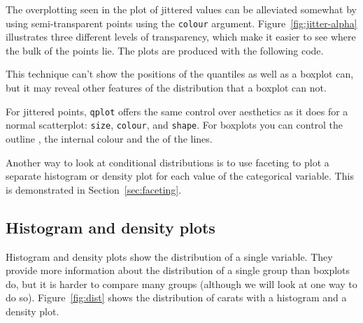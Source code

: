 The overplotting seen in the plot of jittered values can be alleviated somewhat by using semi-transparent points using the {\tt colour} argument. Figure~\ref{fig:jitter-alpha} illustrates three different levels of transparency, which make it easier to see where the bulk of the points lie.  The plots are produced with the following code.

% 


This technique can't show the positions of the quantiles as well as a boxplot can, but it may reveal other features of the distribution that a boxplot can not.

For jittered points, {\tt qplot} offers the same control over aesthetics as it does for a normal scatterplot: {\tt size}, {\tt colour}, and {\tt shape}. For boxplots you can control the outline , the internal  colour and the  of the lines.

Another way to look at conditional distributions is to use faceting to plot a separate histogram or density plot for each value of the categorical variable.  This is demonstrated in Section~\ref{sec:faceting}.

\subsection{Histogram and density plots}\label{sub:distribution}

Histogram and density plots show the distribution of a single variable.  They provide more information about the distribution of a single group than boxplots do, but it is harder to compare many groups (although we will look at one way to do so).  Figure~\ref{fig:dist} shows the distribution of carats with a histogram and a density plot.

% 


